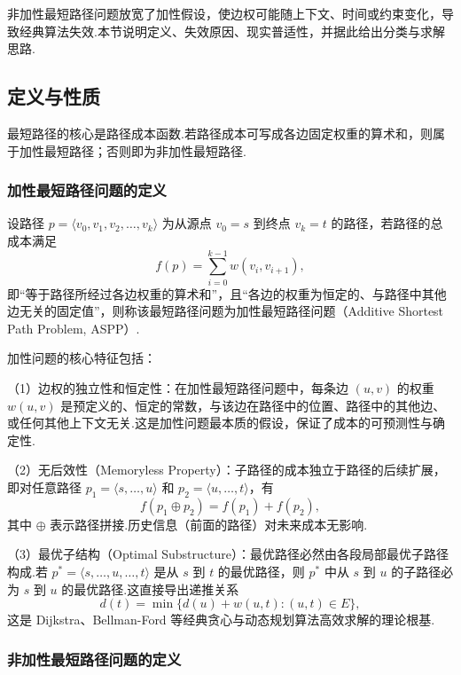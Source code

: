 非加性最短路径问题放宽了加性假设，使边权可能随上下文、时间或约束变化，导致经典算法失效.本节说明定义、失效原因、现实普适性，并据此给出分类与求解思路.

\subsection{定义与性质}

最短路径的核心是路径成本函数.若路径成本可写成各边固定权重的算术和，则属于加性最短路径；否则即为非加性最短路径.

\subsubsection{加性最短路径问题的定义}

\begin{definition}[加性最短路径问题]
设路径 $p = \langle v_0, v_1, v_2, \ldots, v_k \rangle$ 为从源点 $v_0 = s$ 到终点 $v_k = t$ 的路径，若路径的总成本满足
\[
    f(p) = \sum_{i=0}^{k-1} w(v_i, v_{i+1}),
\]
即“等于路径所经过各边权重的算术和”，且“各边的权重为恒定的、与路径中其他边无关的固定值”，则称该最短路径问题为加性最短路径问题（Additive Shortest Path Problem, ASPP）.
\end{definition}

加性问题的核心特征包括：

（1）边权的独立性和恒定性：在加性最短路径问题中，每条边 $(u, v)$ 的权重 $w(u, v)$ 是预定义的、恒定的常数，与该边在路径中的位置、路径中的其他边、或任何其他上下文无关.这是加性问题最本质的假设，保证了成本的可预测性与确定性.

（2）无后效性（Memoryless Property）：子路径的成本独立于路径的后续扩展，即对任意路径 $p_1 = \langle s, \ldots, u \rangle$ 和 $p_2 = \langle u, \ldots, t \rangle$，有
\[
    f(p_1 \oplus p_2) = f(p_1) + f(p_2),
\]
其中 $\oplus$ 表示路径拼接.历史信息（前面的路径）对未来成本无影响.

（3）最优子结构（Optimal Substructure）：最优路径必然由各段局部最优子路径构成.若 $p^* = \langle s, \ldots, u, \ldots, t \rangle$ 是从 $s$ 到 $t$ 的最优路径，则 $p^*$ 中从 $s$ 到 $u$ 的子路径必为 $s$ 到 $u$ 的最优路径.这直接导出递推关系
\[
    d(t) = \min\{d(u) + w(u, t) : (u, t) \in E\},
\]
这是 Dijkstra、Bellman-Ford 等经典贪心与动态规划算法高效求解的理论根基.

\subsubsection{非加性最短路径问题的定义}

